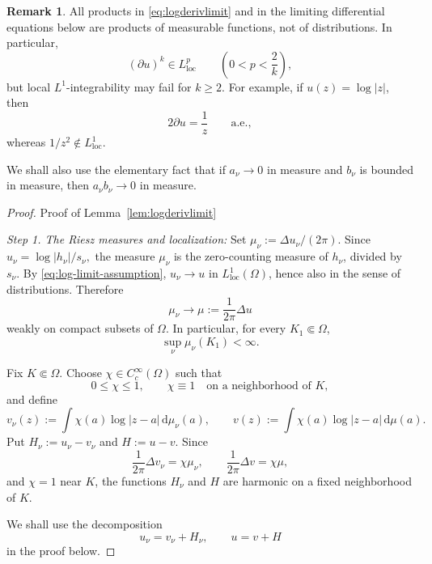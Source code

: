 \documentclass[12pt,letterpaper,reqno]{amsart}
\theoremstyle{definition}
\newtheorem{rem}[thm]{Remark}
\numberwithin{equation}{section}
\newcommand{\loc}{\mathrm{loc}}
\begin{document}
\begin{rem}\label{rem:measurable-products}
All products in \eqref{eq:logderivlimit} and in the limiting differential
equations below are products of measurable functions, not of distributions.
In particular,
\[
(\partial u)^k\in L^p_{\loc}
 \qquad
 \left(0<p<\frac2k\right),
\]
but local \(L^1\)-integrability may fail for \(k\ge2\). For example, if
\(u(z)=\log|z|\), then
\[
 2\partial u=\frac1z
 \qquad\text{a.e.},
\]
whereas \(1/z^2\notin L^1_{\loc}\).

We shall also use the elementary fact that if \(a_\nu\to0\) in measure and
\(b_\nu\) is bounded in measure, then \(a_\nu b_\nu\to0\) in measure.
\end{rem}

\begin{proof}{Proof of Lemma~\ref{lem:logderivlimit}}

\medskip\noindent
\emph{{Step 1. The Riesz measures and localization:}}
Set $
\mu_\nu:=\Delta u_\nu/(2\pi).$
Since
$
u_\nu=\log|h_\nu|/{s_\nu},
$
the measure \(\mu_\nu\) is the zero-counting measure of \(h_\nu\),
divided by \(s_\nu\). By \eqref{eq:log-limit-assumption},
\(u_\nu\to u\) in \(L^1_{\loc}(\Omega)\), hence also in the sense of
distributions. Therefore
\begin{equation}\label{eq:riesz-measure-limit}
 \mu_\nu\longrightarrow
 \mu:=\frac1{2\pi}\Delta u
\end{equation}
weakly on compact subsets of \(\Omega\). In particular, for every
\(K_1\Subset\Omega\),
\begin{equation}\label{eq:riesz-mass-bound}
 \sup_\nu \mu_\nu(K_1)<\infty.
\end{equation}

Fix \(K\Subset\Omega\). Choose
\(\chi\in C_c^\infty(\Omega)\) such that
\[
0\leq\chi\leq1,
\qquad
\chi\equiv1
\quad\text{on a neighborhood of }K,
\]
and define
\begin{equation}\label{eq:localized-potentials}
 v_\nu(z)
 :=
 \int\chi(a)\log|z-a|\,\mathrm d\mu_\nu(a),
 \qquad
 v(z)
 :=
 \int\chi(a)\log|z-a|\,\mathrm d\mu(a).
\end{equation}
Put
$
H_\nu:=u_\nu-v_\nu$
and $
H:=u-v.
$
Since
\[
\frac1{2\pi}\Delta v_\nu=\chi\mu_\nu,
\qquad
\frac1{2\pi}\Delta v=\chi\mu,
\]
and \(\chi=1\) near \(K\), the functions \(H_\nu\) and \(H\) are
harmonic on a fixed neighborhood of \(K\).

We shall use the decomposition
\begin{equation}\label{eq:potential-harmonic-decomposition}
 u_\nu=v_\nu+H_\nu,
 \qquad
 u=v+H
\end{equation}
in the proof below.


\end{proof}
\end{document}
